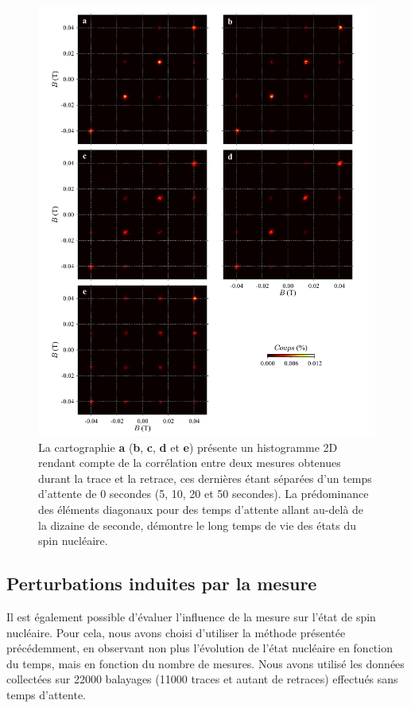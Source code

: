\begin{figure}[h!]
\includegraphics[scale=0.45]{Resultats/HistTime/HistTime.pdf} 
\caption{La cartographie \textbf{a} (\textbf{b}, \textbf{c}, \textbf{d} et \textbf{e}) présente un histogramme 2D rendant compte de la corrélation entre deux mesures obtenues durant la trace et la retrace, ces dernières étant séparées d'un temps d'attente de 0 secondes (5, 10, 20 et 50 secondes). La prédominance des éléments diagonaux pour des temps d'attente allant au-delà de la dizaine de seconde, démontre le long temps de vie des états du spin nucléaire.}
\label{evolution_temps}
\end{figure}

\subsection{Perturbations induites par la mesure}
Il est également possible d'évaluer l'influence de la mesure sur l'état de spin nucléaire. Pour cela, nous avons choisi d'utiliser la méthode présentée précédemment, en observant non plus l'évolution de l'état nucléaire en fonction du temps, mais en fonction du nombre de mesures. Nous avons utilisé les données collectées sur 22000 balayages (11000 traces et autant de retraces) effectués sans temps d'attente.

